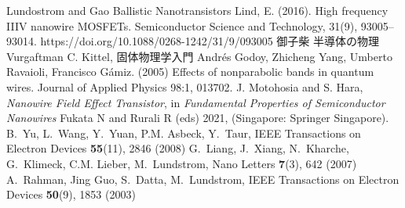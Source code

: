 \documentclass[11pt,uplatex,a4paper]{jsarticle}
\begin{document}
\begin{thebibliography}{99}
   Lundostrom and Gao Ballistic Nanotransistors
   ﻿Lind, E. (2016). High frequency III{\textendash}V nanowire MOSFETs. Semiconductor Science and Technology, 31(9), 93005–93014. https://doi.org/10.1088/0268-1242/31/9/093005
   御子柴 半導体の物理
   Vurgaftman
   C. Kittel, 固体物理学入門
   Andr\'es Godoy, Zhicheng Yang, Umberto Ravaioli, Francisco Gámiz. (2005) Effects of nonparabolic bands in quantum wires. Journal of Applied Physics 98:1, 013702.
  J. Motohosia and S. Hara, \textit{Nanowire Field Effect Transistor},
	 in {\em Fundamental Properties of Semiconductor
  Nanowires\/} Fukata N and Rurali R (eds) 2021, (Singapore: Springer Singapore).
B.~Yu, L.~Wang, Y.~Yuan, P.M. Asbeck, Y.~Taur, IEEE Transactions on Electron
  Devices \textbf{55}(11), 2846 (2008)
G.~Liang, J.~Xiang, N.~Kharche, G.~Klimeck, C.M. Lieber, M.~Lundstrom, Nano
  Letters \textbf{7}(3), 642 (2007)
A.~Rahman, {Jing Guo}, S.~Datta, M.~Lundstrom, IEEE Transactions on Electron
  Devices \textbf{50}(9), 1853 (2003)

\end{thebibliography}
\end{document}

